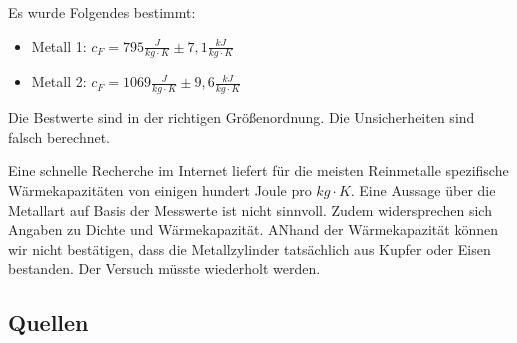 \documentclass[class=article, crop=false]{standalone}
\begin{document}
Es wurde Folgendes bestimmt:

\begin{itemize}
  \item Metall 1: $c_F = 795\frac{J}{kg\cdot K}\pm 7,1\frac{kJ}{kg\cdot K}$
  \item Metall 2: $c_F = 1069\frac{J}{kg\cdot K}\pm 9,6\frac{kJ}{kg\cdot K}$
\end{itemize}

Die Bestwerte sind in der richtigen Größenordnung. Die Unsicherheiten
sind falsch berechnet.

Eine schnelle Recherche im Internet liefert für die meisten Reinmetalle
spezifische Wärmekapazitäten von einigen hundert Joule pro
\(kg\cdot K\). Eine Aussage über die Metallart auf Basis der Messwerte
ist nicht sinnvoll. Zudem widersprechen sich Angaben zu Dichte und
Wärmekapazität. ANhand der Wärmekapazität können wir nicht bestätigen,
dass die Metallzylinder tatsächlich aus Kupfer oder Eisen bestanden. Der
Versuch müsste wiederholt werden.

\hypertarget{quellen}{%
\subsection{Quellen}\label{quellen}}
\end{document}
